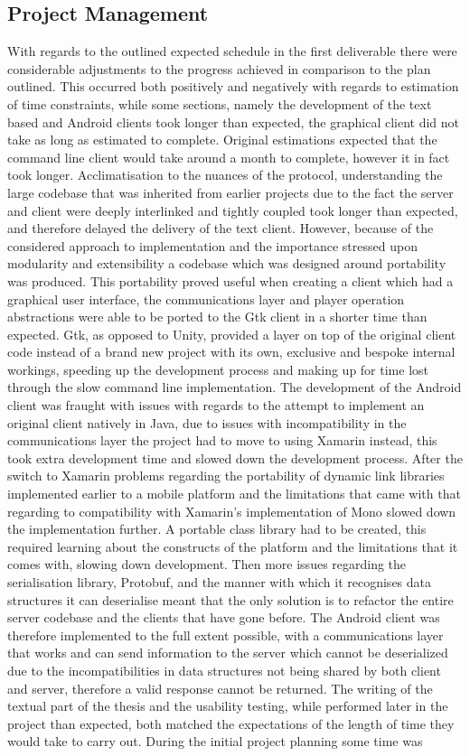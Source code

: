 \documentclass{article}
\begin{document}
\subsection{Project Management}
With regards to the outlined expected schedule in the first deliverable there were considerable adjustments to the progress achieved in comparison to the plan outlined. This occurred both positively and negatively with regards to estimation of time constraints, while some sections, namely the development of the text based and Android clients took longer than expected, the graphical client did not take as long as estimated to complete. Original estimations expected that the command line client would take around a month to complete, however it in fact took longer. Acclimatisation to the nuances of the protocol, understanding the large codebase that was inherited from earlier projects due to the fact the server and client were deeply interlinked and tightly coupled took longer than expected, and therefore delayed the delivery of the text client. However, because of the considered approach to implementation and the importance stressed upon modularity and extensibility a codebase which was designed around portability was produced. This portability proved useful when creating a client which had a graphical user interface, the communications layer and player operation abstractions were able to be ported to the Gtk client in a shorter time than expected. Gtk, as opposed to Unity, provided a layer on top of the original client code instead of a brand new project with its own, exclusive and bespoke internal workings, speeding up the development process and making up for time lost through the slow command line implementation. The development of the Android client was fraught with issues with regards to the attempt to implement an original client natively in Java, due to issues with incompatibility in the communications layer the project had to move to using Xamarin instead, this took extra development time and slowed down the development process. After the switch to Xamarin problems regarding the portability of dynamic link libraries implemented earlier to a mobile platform and the limitations that came with that regarding to compatibility with Xamarin’s implementation of Mono slowed down the implementation further. A portable class library had to be created, this required learning about the constructs of the platform and the limitations that it comes with, slowing down development. Then more issues regarding the serialisation library, Protobuf, and the manner with which it recognises data structures it can deserialise meant that the only solution is to refactor the entire server codebase and the clients that have gone before. The Android client was therefore implemented to the full extent possible, with a communications layer that works and can send information to the server which cannot be deserialized due to the incompatibilities in data structures not being shared by both client and server, therefore a valid response cannot be returned. The writing of the textual part of the thesis and the usability testing, while performed later in the project than expected, both matched the expectations of the length of time they would take to carry out. During the initial project planning some time was 
\end{document}
